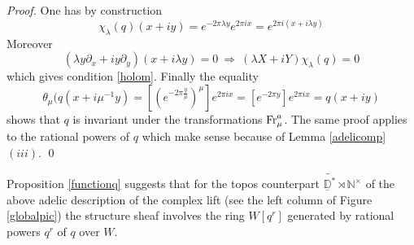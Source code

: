\documentclass[graybox, envcountsect%
]{svmult}
\def\D{{\mathbb D}}
\def\N{{\mathbb N}}
\def\dst{{\underline \D^*}}
\def\fr{{\rm Fr}}
\def\nt{\N^{\times}}
\begin{document}
\begin{proof} One has by construction
$$
 \chi_\lambda(q)(x+iy)=e^{-2\pi \lambda y}e^{2\pi i x}=e^{2\pi i (x+i\lambda y)}
 $$
 Moreover
 $$
 (\lambda y\partial_x +i y\partial_y)(x+i\lambda y)=0\ \Rightarrow \ \left(\lambda X+i Y\right) 	\chi_\lambda(q)=0
 $$
 which gives condition \eqref{holom}. Finally the equality
$$
 \theta_\mu(q(x+i \mu^{-1}y)=[(e^{-2\pi \frac{y}{\mu}})^\mu]e^{2\pi i x}
 =[e^{-2\pi y}]e^{2\pi i x}=q(x+iy)
 $$	
 shows that $q$ is invariant under the transformations $\fr^a_\mu$. The same proof applies to the rational powers of $q$ which make sense because of Lemma \ref{adelicomp} $(iii)$.
\qed\end{proof}
\begin{remark}\label{perfectoid} Proposition \ref{functionq} suggests that for the topos counterpart $\tilde \dst\rtimes \nt$ of the above adelic description of the complex lift  (see the left column of Figure \ref{globalpic}) the structure sheaf  involves the ring $W[q^r]$ generated by rational powers $q^r$ of $q$ over $W$. 	
\end{remark}

   
\end{document}
